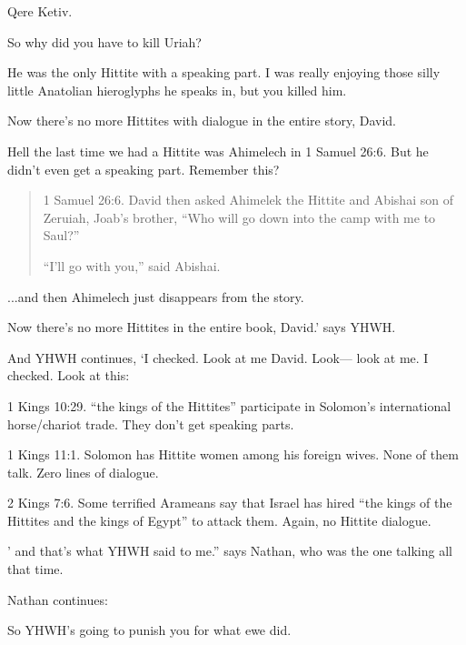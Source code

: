 {
}
{
}
{
	Qere Ketiv.

	So why did you have to kill Uriah?

	He was the only Hittite with a speaking part. I was really
	enjoying those silly little Anatolian hieroglyphs he speaks in,
	but you killed him.

	Now there's no more Hittites with dialogue in the entire story,
	David.

	Hell the last time we had a Hittite was Ahimelech in 1 Samuel
	26:6. But he didn't even get a speaking part. Remember this?

	\begin{quote}
	1 Samuel 26:6. David then asked Ahimelek the Hittite and Abishai
	son of Zeruiah, Joab’s brother, “Who will go down into the camp
	with me to Saul?”

	“I’ll go with you,” said Abishai.
	\end{quote}

	...and then Ahimelech just disappears from the story.

	Now there's no more Hittites in the entire book, David.’ says
	YHWH.

	And YHWH continues, ‘I checked. Look at me David. Look--- look
	at me. I checked. Look at this:

	1 Kings 10:29. “the kings of the Hittites” participate in
	Solomon's international horse/chariot trade. They don't get
	speaking parts.

	1 Kings 11:1. Solomon has Hittite women among his foreign wives.
	None of them talk. Zero lines of dialogue.

	2 Kings 7:6. Some terrified Arameans say that Israel has hired
	“the kings of the Hittites and the kings of Egypt” to attack
	them. Again, no Hittite dialogue.

	’ and that's what YHWH said to me.” says Nathan, who was the one
	talking all that time.
}

{
}
{
}
{
	Nathan continues:

	So YHWH's going to punish you for what ewe did.
}

